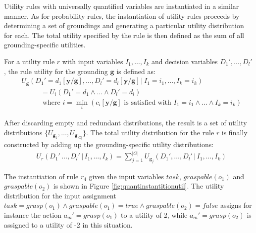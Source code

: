 Utility rules with universally quantified variables are instantiated in a similar manner. As for probability rules, the instantiation of utility rules proceeds by determining a set of groundings and generating a particular utility distribution for each. The total utility specified by the rule is then defined as the sum of all grounding-specific utilities.

For a utility rule $r$ with input variables $I_1, \dots, I_k$ and decision variables $D_1', \dots, D_l'$, the rule utility for the grounding $\mathbf{g}$ is defined as:
 \begin{align}
& U_{\mathbf{g}}(D_1'\!=\!d_1[\mathbf{y} / \mathbf{g}], \dots, D_l'\!=\!d_l[\mathbf{y} / \mathbf{g}] \, | \, I_1\!=\!i_1, \dots, I_k\!=\!i_k) \label{eq:quantifuruledistrib} \\ 
& \; \; \; \; \; \; \; \;   \; \; = U_i(D_1'\!=\!d_1 \land \dots \land D_l'\!=\!d_l) \nonumber \\
& \; \; \; \; \; \; \; \;   \; \; \;\text{where } i = \min_i (c_i[\mathbf{y} / \mathbf{g}]\text{ is satisfied with } I_1\!=\!i_1 \land \dots \land I_k\!=\!i_k) \nonumber
\end{align}

After discarding empty and redundant distributions, the result is a set of utility distributions $ \{ U_{\mathbf{g}_1}, \dots, U_{\mathbf{g}_{|G|}} \}$. The total utility distribution for the rule $r$ is finally constructed by adding up the grounding-specific utility distributions:   
\begin{align}
& U_{r}(D_1'\, \dots, D_l' \, | \,  I_1, \dots, I_k) = \sum_{j=1}^{|G|} U_{\mathbf{g}_j}(D_1', \dots, D_l' \, | \, I_1, \dots, I_k) \label{eq:quantifuruledistrib2}
\end{align}


The instantiation of rule $r_4$ given the input variables $\mathit{task}$, $\mathit{graspable}(o_1)$ and $\mathit{graspable}(o_2)$ is shown in Figure  \ref{fig:quantinstantitionutil}.  The utility distribution for the input assignment $\mathit{task}\!=\!\mathit{grasp}(o_1) \land \mathit{graspable}(o_1) \!=\!\mathit{true} \land \mathit{graspable}(o_2)\!=\!\mathit{false}$ assigns for instance the action $a_m'\!=\!\mathit{grasp}(o_1)$ to a utility of 2, while $a_m'\!=\!\mathit{grasp(o_2)}$ is assigned to a utility of -2 in this situation.

